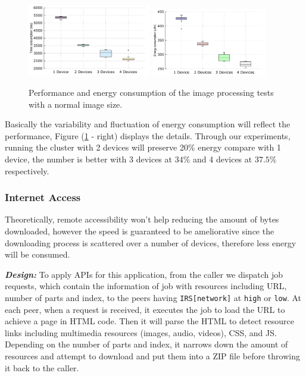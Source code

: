 \documentclass{sig-alternate}[10pt]
\begin{document}
\begin{CCSXML}
\begin{figure}
	\centering
		\includegraphics[width=0.48\textwidth]{data/img_small_perf_full.pdf}
		\includegraphics[width=0.45\textwidth]{data/img_small_energy.pdf}
	\caption{Performance and energy consumption of the image processing tests with a normal image size.}
	\label{fig:small_img_perf}
\end{figure}

Basically the variability and fluctuation of energy consumption will reflect the performance, Figure (\ref{fig:small_img_perf} - right) displays the details. Through our experiments, running the cluster with 2 devices will preserve 20\% energy compare with 1 device, the number is better with 3 devices at $34\%$ and 4 devices at $37.5\%$ respectively.


\subsubsection{Internet Access} 
Theoretically, remote accessibility won't help reducing the amount of bytes downloaded, however the speed is guaranteed to be ameliorative since the downloading process is scattered over a number of devices, therefore less energy will be consumed. 

\textbf{\emph{Design:}}
To apply APIs for this application, from the caller we dispatch job requests, which contain the information of job with resources including URL, number of parts and index, to the peers having \texttt{IRS[network]} at \texttt{high} or \texttt{low}. At each peer, when a request is received, it executes the job to load the URL to achieve a page in HTML code. Then it will parse the HTML to detect resource links including multimedia resources (images, audio, videos), CSS, and JS. Depending on the number of parts and index, it narrows down the amount of resources and attempt to download and put them into a ZIP file before throwing it back to the caller.


\end{CCSXML}
\end{document}
